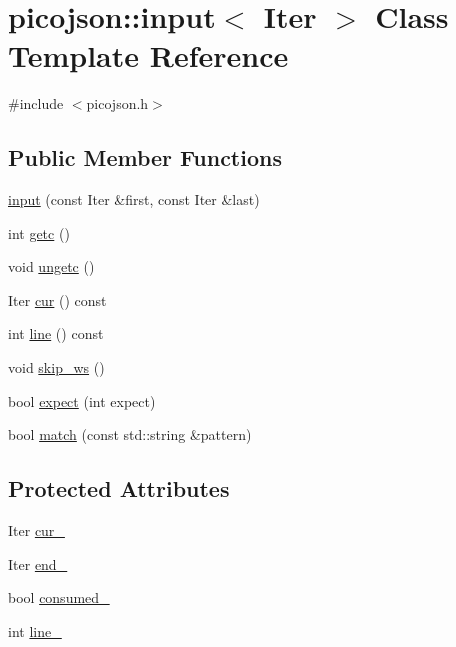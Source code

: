 \hypertarget{classpicojson_1_1input}{}\section{picojson\+:\+:input$<$ Iter $>$ Class Template Reference}
\label{classpicojson_1_1input}


{\ttfamily \#include $<$picojson.\+h$>$}

\subsection*{Public Member Functions}
\begin{DoxyCompactItemize}
\item 
\hyperlink{classpicojson_1_1input_ab1ca217622d921118707de9e9011a62f}{input} (const Iter \&first, const Iter \&last)
\item 
int \hyperlink{classpicojson_1_1input_a3e8ba0b09a989efa0dc583096984ea8e}{getc} ()
\item 
void \hyperlink{classpicojson_1_1input_a96ccc244e73b2ab87ded38c98e98d573}{ungetc} ()
\item 
Iter \hyperlink{classpicojson_1_1input_ab2933aa5b68e73877fd331b925f4bf40}{cur} () const
\item 
int \hyperlink{classpicojson_1_1input_a5852aded6d48e28542f23fe0083a51fa}{line} () const
\item 
void \hyperlink{classpicojson_1_1input_aa83aefe87374a5e24ab8c8e80fef4aa4}{skip\+\_\+ws} ()
\item 
bool \hyperlink{classpicojson_1_1input_a14c29e99d9c9aa8cdbb46178c434d663}{expect} (int expect)
\item 
bool \hyperlink{classpicojson_1_1input_ad15f360122daf49ddf7a2a8591fa4364}{match} (const std\+::string \&pattern)
\end{DoxyCompactItemize}
\subsection*{Protected Attributes}
\begin{DoxyCompactItemize}
\item 
Iter \hyperlink{classpicojson_1_1input_afb97b3422a91d0f3388527a5999c8174}{cur\+\_\+}
\item 
Iter \hyperlink{classpicojson_1_1input_acb4fd4c90d1b0db37bc32ccae16361ab}{end\+\_\+}
\item 
bool \hyperlink{classpicojson_1_1input_af07464e7d4f25b902d65d8f8ee79b8a6}{consumed\+\_\+}
\item 
int \hyperlink{classpicojson_1_1input_a7bbb41c7f78ffc19d3219e38c2858b74}{line\+\_\+}
\end{DoxyCompactItemize}


